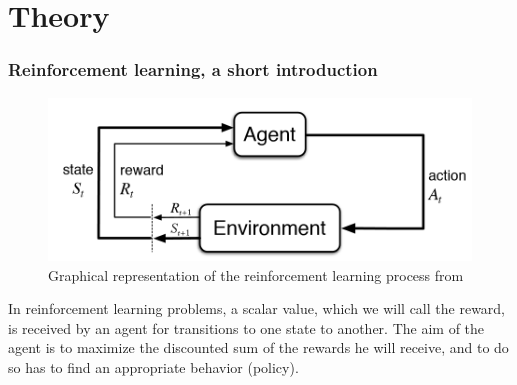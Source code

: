 \documentclass[14pt,a4paper]{article}
\theoremstyle{definition}
\begin{document}
\tableofcontents
{}
\newpage
{}


%
%
%
%
%




\part*{Theory}
\section{Reinforcement learning, a short introduction}

\begin{figure}[H]
\centering
\includegraphics[scale=0.5]{img/RL_graph.png}
\caption{Graphical representation of the reinforcement learning process from \citep{Sutton}}
\label{RL}
\end{figure}

In reinforcement learning problems, a scalar value, which we will call the reward, is received by an agent for transitions to one state to another. The aim of the agent is to maximize the discounted sum of the rewards he will receive, and to do so has to find an appropriate behavior (policy).
\end{document}
